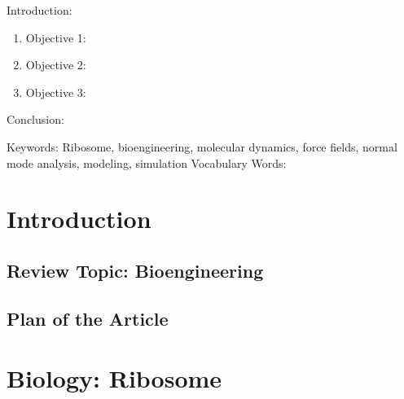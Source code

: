 

\twocolumn
\scriptsize
\begin{frontmatter}
		\title{}
		\author{}
		\address{The Mathematical Learning Space}
\end{frontmatter}	

Introduction:
\begin{enumerate}
\item Objective 1:
\item Objective 2:
\item Objective 3:
\end{enumerate}
Conclusion:

Keywords: Ribosome, bioengineering, molecular dynamics, force fields, normal mode analysis, modeling, simulation 
Vocabulary Words:

\section{Introduction}

\subsection{Review Topic: Bioengineering}

\subsection{Plan of the Article}

\section{Biology: Ribosome}
\vspace{6pt}


\begin{figure}[H]
	\centering
\begin{minipage}[b]{0.3\linewidth}
	\caption{}
	\label{fig:FigureA}
\end{minipage}\hfill
\begin{minipage}[b]{0.3\linewidth}
	\caption{}
	\label{fig:FigureB}
\end{minipage}\hfill
\begin{minipage}[b]{0.3\linewidth}
	\caption{}
	\label{fig:FigureC}
\end{minipage}\hfill
	\caption{}
	\label{fig:Figure_1}
\end{figure}


